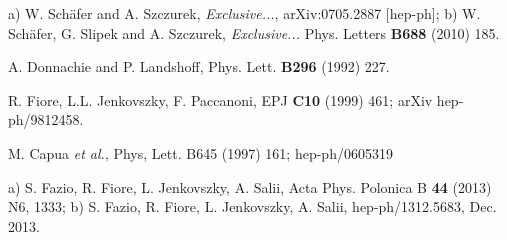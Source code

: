 \documentclass[12pt]{article}
\begin{document}
\begin{thebibliography}{99}
 a) W. Sch\"afer and A. Szczurek, {\it Exclusive...}, arXiv:0705.2887 [hep-ph]; b) W. Sch\"afer, G. Slipek and A. Szczurek,
{\it Exclusive...} Phys. Letters {\bf B688} (2010) 185. 

 A. Donnachie and P. Landshoff, Phys. Lett. {\bf B296} (1992) 227.

 R. Fiore, L.L. Jenkovszky, F. Paccanoni, EPJ {\bf C10} (1999) 461; arXiv hep-ph/9812458.

 M. Capua {\it et al.}, Phys, Lett. {B645} (1997) 161; hep-ph/0605319

 a) S. Fazio, R. Fiore, L. Jenkovszky, A. Salii, Acta Phys. Polonica B {\bf 44} (2013) N6, 1333; b) S. Fazio, R. Fiore, L. Jenkovszky, A. Salii, 
hep-ph/1312.5683, Dec. 2013. 

\end{thebibliography}
\end{document}

